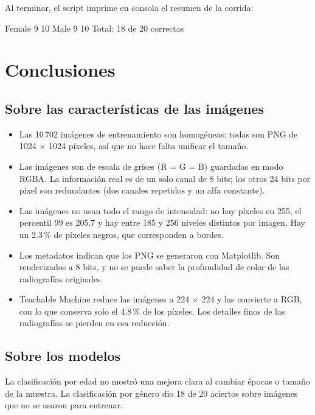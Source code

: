 \documentclass[a4paper,11pt]{article}
\begin{document}
  Al terminar, el script imprime en consola el resumen de la corrida:

  \begin{code}[lang=text]
Female      9   10
Male        9   10
Total: 18 de 20 correctas
  \end{code}

  \section{Conclusiones}
  \subsection{Sobre las características de las imágenes}
  \begin{itemize}
    \item Las 10\,702 imágenes de entrenamiento son homogéneas: todas son
      PNG de 1024 $\times$ 1024 píxeles, así que no hace falta unificar el
      tamaño.
    \item Las imágenes son de escala de grises (R = G = B) guardadas en modo
      RGBA. La información real es de un solo canal de 8 bits; los otros 24 bits
      por píxel son redundantes (dos canales repetidos y un alfa constante).
    \item Las imágenes no usan todo el rango de intensidad: no hay píxeles en
      255, el percentil 99 es 205.7 y hay entre 185 y 256 niveles distintos por
      imagen. Hay un 2.3\,\% de píxeles negros, que corresponden a bordes.
    \item Los metadatos indican que los PNG se generaron con Matplotlib. Son
      renderizados a 8 bits, y no se puede saber la profundidad de color de las
      radiografías originales.
    \item Teachable Machine reduce las imágenes a 224 $\times$ 224 y las convierte
      a RGB, con lo que conserva solo el 4.8\,\% de los píxeles. Los detalles
      finos de las radiografías se pierden en esa reducción.
  \end{itemize}

  \subsection{Sobre los modelos}
  La clasificación por edad no mostró una mejora clara al cambiar épocas o
  tamaño de la muestra. La clasificación por género dio 18 de 20 aciertos sobre
  imágenes que no se usaron para entrenar.
\end{document}

